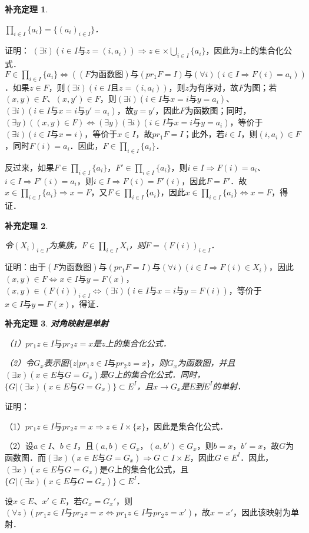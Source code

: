 \documentclass[12pt, a4paper, oneside]{book}
\newtheorem{cor}{补充定理}
\begin{document}
			\begin{cor}\label{cor132}
				\hfill\par
				$\prod\limits_{i\in I}\{a_i\}=\{(a_i)_{i\in I}\}$．
			\end{cor}
			证明：
			$(\exists i)(i\in I\text{与}z=(i, a_i))\Rightarrow z\in \times \bigcup\limits_{i\in I}\{a_i\}$，因此为$z$上的集合化公式．
			$F\in \prod\limits_{i\in I}\{a_i\}\Leftrightarrow ((F\text{为函数图})\text{与}(pr_1F= I)\text{与}(\forall i)(i\in I\Rightarrow F(i)=a_i))$．如果$z\in F$，则$(\exists i)(i\in I且z=(i, a_i))$，则$z\text{为有序对}$，故$F$为图；若$(x, y)\in F$、$(x, y')\in F$，则$(\exists i)(i\in I\text{与}x=i\text{与}y=a_i)$、$(\exists i)(i\in I\text{与}x=i\text{与}y'=a_i)$，故$y=y'$，因此$F$为函数图；同时，$(\exists y)((x, y)\in F)\Leftrightarrow (\exists y)(\exists i)(i\in I\text{与}x=i\text{与}y=a_i)$，等价于$(\exists i)(i\in I\text{与}x=i)$，等价于$x\in I$，故$pr_1F= I$；此外，若$i\in I$，则$(i, a_i)\in F$，同时$F(i)=a_i$．因此，$F\in \prod\limits_{i\in I}\{a_i\}$．
			\par
			反过来，如果$F\in \prod\limits_{i\in I}\{a_i\}$，$F'\in \prod\limits_{i\in I}\{a_i\}$，则$i\in I\Rightarrow F(i)=a_i$、$i\in I\Rightarrow F'(i)=a_i$，则$i\in I\Rightarrow F(i)=F'(i)$，因此$F=F'$．故$x\in \prod\limits_{i\in I}\{a_i\}\Rightarrow x=F$，又$F\in \prod\limits_{i\in I}\{a_i\}$，因此$x\in \prod\limits_{i\in I}\{a_i\}\Leftrightarrow x=F$，得证．
			
			\begin{cor}\label{cor133}
				\hfill\par
				令$(X_i)_{i\in I}$为集族，$F\in \prod\limits_{i\in I}X_i$，则$F=(F(i))_{i\in I}$．
			\end{cor}
			证明：由于$(F\text{为函数图})\text{与}(pr_1F= I)\text{与}(\forall i)(i\in I\Rightarrow F(i)\in X_i)$，因此$(x, y)\in F\Leftrightarrow x\in I\text{与}y=F(x)$，$(x, y)\in (F(i))_{i\in I}\Leftrightarrow (\exists i)(i\in I\text{与}x=i\text{与}y=F(i))$，等价于$x\in I\text{与}y=F(x)$，得证．
						
			\begin{cor}\label{cor134}
				\textbf{对角映射是单射}
				\par
				（1）$pr_1z\in I\text{与}pr_2z=x$是$z$上的集合化公式．
				\par
				（2）令$G_x$表示图$\{z|pr_1z\in I\text{与}pr_2z=x\}$，则$G_x$为函数图，并且$(\exists x)(x\in E\text{与}G=G_x)$是$G$上的集合化公式．同时，$\{G|(\exists x)(x\in E\text{与}G=G_x)\}\subset E^I$，且$x\to G_x$是$E$到$E^I$的单射．
			\end{cor}
			证明：
			\par
			（1）$pr_1z\in I\text{与}pr_2z=x\Rightarrow z\in I\times \{x\}$，因此是集合化公式．
			\par
			（2）设$a\in I$、$b\in I$，且$(a, b)\in G_x$，$(a, b')\in G_x$，则$b=x$，$b'=x$，故$G$为函数图．而$(\exists x)(x\in E\text{与}G=G_x)\Rightarrow G\subset I\times E$，因此$G\in E^I$．因此，$(\exists x)(x\in E\text{与}G=G_x)$是$G$上的集合化公式，且$\{G|(\exists x)(x\in E\text{与}G=G_x)\}\subset E^I$．
			\par
			设$x\in E$、$x'\in E$，若$G_x=G_x'$，则$(\forall z)(pr_1z\in I\text{与}pr_2z=x\Leftrightarrow pr_1z\in I\text{与}pr_2z=x')$，故$x=x'$，因此该映射为单射．
\end{document}
